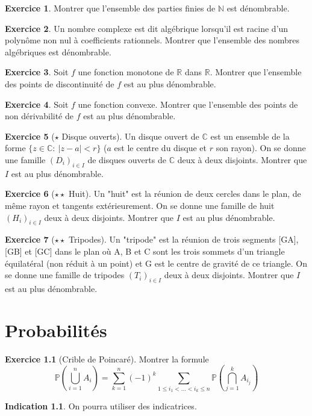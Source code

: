 \documentclass[french]{book}
\renewcommand{\P}{\mathbb{P}}
\newcommand{\N}{\mathbb{N}}
\newcommand{\R}{\mathbb{R}}
\newcommand{\C}{\mathbb{C}}
\theoremstyle{definition}
\newtheorem{ex}{Exercice}[chapter]
\theoremstyle{theorem}
\newtheorem*{ind}{Indication}
\theoremstyle{remark}
\begin{document}
\begin{ex}
	Montrer que l'ensemble des parties finies de $\N$ est dénombrable.
\end{ex}

\begin{ex}
	Un nombre complexe est dit algébrique lorsqu'il est racine d'un polynôme non nul à coefficients rationnels. Montrer que l'ensemble des nombres algébriques est dénombrable.
\end{ex}

\begin{ex}
	Soit $f$ une fonction monotone de $\R$ dans $\R$. Montrer que l'ensemble des points de discontinuité de $f$ est au plus dénombrable.
\end{ex}

\begin{ex}
	Soit $f$ une fonction convexe. Montrer que l'ensemble des points de non dérivabilité de $f$ est au plus dénombrable.
\end{ex}

\begin{ex}[$\star$ Disque ouverts]
	Un disque ouvert de $\C$ est un ensemble de la forme $\{z\in\C : \ \lvert z-a\rvert <r\}$ ($a$ est le centre du disque et $r$ son rayon). On se donne une famille $(D_i)_{i\in I}$ de disques ouverts de $\C$ deux à deux disjoints. Montrer que $I$ est au plus dénombrable.
\end{ex}

\begin{ex}[$\star\star$ Huit]
	Un "huit" est la réunion de deux cercles dans le plan, de même rayon et tangents extérieurement. On se donne une famille de huit $(H_i)_{i\in I}$ deux à deux disjoints. Montrer que $I$ est au plus dénombrable.
\end{ex}

\begin{ex}[$\star\star$ Tripodes]
	Un "tripode" est la réunion de trois segments [GA], [GB] et [GC] dans le plan où A, B et C sont les trois sommets d'un triangle équilatéral (non réduit à un point) et G est le centre de gravité de ce triangle. On se donne une famille de tripodes $(T_i)_{i\in I}$ deux à deux disjoints. Montrer que $I$ est au plus dénombrable.
\end{ex}

\chapter{Probabilités}

\begin{ex}[Crible de Poincaré]
	Montrer la formule $$\P\left(\bigcup_{i=1}^{n}A_i\right)=\sum_{k=1}^{n}(-1)^k\sum_{1\leqslant i_1<\ldots<i_k\leqslant n}\P\left(\bigcap_{j=1}^{k}A_{i_j}\right)$$ \begin{ind}
		On pourra utiliser des indicatrices.
	\end{ind}
\end{ex}
\end{document}
